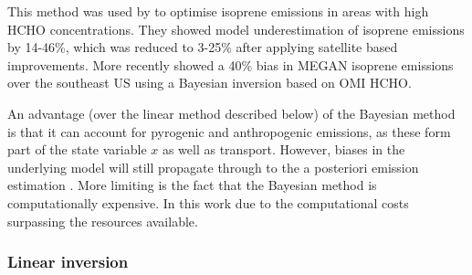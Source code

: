       This method was used by \textcite{Shim2005} to optimise isoprene emissions in areas with high HCHO concentrations. 
      They showed model underestimation of isoprene emissions by 14-46\%, which was reduced to 3-25\% after applying satellite based improvements.
      More recently \textcite{Kaiser2018} showed a 40\% bias in MEGAN isoprene emissions over the southeast US using a Bayesian inversion based on OMI HCHO.
      
      An advantage (over the linear method described below) of the Bayesian method is that it can account for pyrogenic and anthropogenic emissions, as these form part of the state variable $x$ as well as transport.
      However, biases in the underlying model will still propagate through to the a posteriori emission estimation \parencite{Curci2010}.
      More limiting is the fact that the Bayesian method is computationally expensive. %
      In this work  due to the computational costs surpassing the resources available.
      
    \subsubsection{Linear inversion}
      \label{BioIsop:intro:top_down_linear}
      

